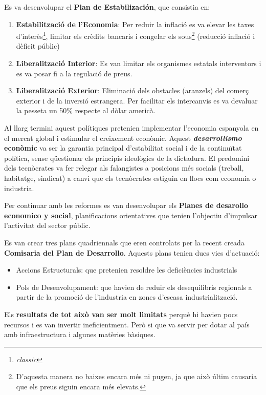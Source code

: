 \documentclass[arial,a4paper,print]{article}
\begin{document}
Es va desenvolupar el \textbf{Plan de Estabilización}, que consistia en:
\begin{enumerate}
\item \textbf{Estabilització de l'Economia}: Per reduir la inflació es va elevar les taxes d'interès\footnote{\textit{classic}}, limitar els crèdits bancaris i congelar els sous\footnote{D'aquesta manera no baixes encara més ni pugen, ja que això últim causaria que els preus siguin encara més elevats.} (reducció inflació i dèficit públic)

\item \textbf{Liberalització Interior}: Es van limitar els organismes estatals interventors i es va posar fi a la regulació de preus. 

\item \textbf{Liberalització Exterior}: Eliminació dels obstacles (aranzels) del comerç exterior i de la inversió estrangera. Per facilitar els intercanvis es va devaluar la pesseta un 50\% respecte al dòlar americà. 
\end{enumerate}
Al llarg termini aquest polítiques pretenien implementar l'economia espanyola en el mercat global i estimular el creixement econòmic. Aquest \textbf{\textit{desarrollismo} econòmic} va ser la garantia principal d'estabilitat social i de la continuïtat política, sense qüestionar els principis ideològics de la dictadura. El predomini dels tecnòcrates va fer relegar als falangistes a posicions més socials (treball, habitatge, sindicat) a canvi que els tecnòcrates estiguin en llocs com economia o industria.  

Per continuar amb les reformes es van desenvolupar els \textbf{Planes de desarollo economico y social}, planificacions orientatives que tenien l'objectiu d'impulsar l'activitat del sector públic. 

Es van crear tres plans quadriennals que eren controlats per la recent creada \textbf{Comisaria del Plan de Desarrollo}. Aquests plans tenien dues vies d'actuació:
\begin{itemize}
\item Accions Estructurals: que pretenien resoldre les deficiències industrials
\item Pols de Desenvolupament: que havien de reduir els desequilibris regionals a partir de la promoció de l'industria en zones d'escasa industrialització. 
\end{itemize}
Els \textbf{resultats de tot això van ser molt limitats} perquè hi havien pocs recursos i es van invertir ineficientment. Però si que va servir per dotar al país amb infraestructura i algunes matèries bàsiques.  
\end{document}
